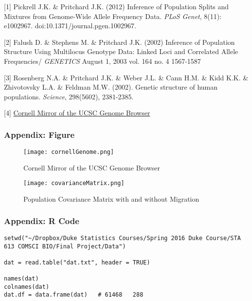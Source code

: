 \documentclass{article} %
\begin{document}
\small{
[1] Pickrell J.K. \& Pritchard J.K. (2012)  Inference of Population Splits and Mixtures from Genome-Wide Allele Frequency Data. {\it PLoS Genet}, 8(11): e1002967. doi:10.1371/journal.pgen.1002967.

[2] Falush D. \& Stephens M. \& Pritchard J.K. (2002) Inference of Population Structure Using Multilocus Genotype Data: Linked Loci and Correlated Allele Frequencies/ {\it GENETICS} August 1, 2003 vol. 164 no. 4 1567-1587

[3] Rosenberg N.A. \& Pritchard J.K. \& Weber J.L. \& Cann H.M. \& Kidd K.K. \& Zhivotovsky L.A. \& Feldman M.W. (2002). Genetic structure of human populations. {\it Science}, 298(5602), 2381-2385.

[4] \href{http://genome-mirror.bscb.cornell.edu/cgi-bin/hgTables?hgsid=69949_sX86SIFDIvyv5JAaIwQzzJg4XPcf}{Cornell Mirror of the UCSC Genome Browser} 

\newpage

\subsubsection*{Appendix: Figure}


\begin{figure}[H]
\centering
\caption{Cornell Mirror of the UCSC Genome Browser }
\texttt{[image: cornellGenome.png]}
\label{fig:boat1}
\end{figure}


\begin{figure}[H]
\centering
\caption{Population Covariance Matrix with and without Migration}
\texttt{[image: covarianceMatrix.png]}
\label{fig:boat1}
\end{figure}




\newpage
\subsubsection*{Appendix: R Code}

\begin{verbatim}
setwd("~/Dropbox/Duke Statistics Courses/Spring 2016 Duke Course/STA 613 COMSCI BIO/Final Project/Data")

dat = read.table("dat.txt", header = TRUE)

names(dat)
colnames(dat)
dat.df = data.frame(dat)   # 61468   288


\end{verbatim}}
\end{document}
